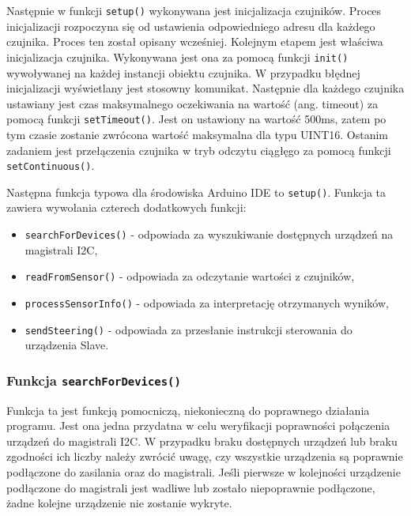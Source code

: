 \documentclass{report}
\begin{document}
Następnie w funkcji \texttt{setup()} wykonywana jest inicjalizacja czujników. Proces inicjalizacji rozpoczyna się od ustawienia odpowiedniego adresu dla każdego czujnika. Proces ten został opisany wcześniej. Kolejnym etapem jest właściwa inicjalizacja czujnika. Wykonywana jest ona za pomocą funkcji \texttt{init()} wywoływanej na każdej instancji obiektu czujnika. W przypadku błędnej inicjalizacji wyświetlany jest stosowny komunikat. Następnie dla każdego czujnika ustawiany jest czas maksymalnego oczekiwania na wartość (ang. timeout) za pomocą funkcji \texttt{setTimeout()}. Jest on ustawiony na wartość 500ms, zatem po tym czasie zostanie zwrócona wartość maksymalna dla typu UINT16. Ostanim zadaniem jest przełączenia czujnika w tryb odczytu ciągłęgo za pomocą funkcji \texttt{setContinuous()}.


Następna funkcja typowa dla środowiska Arduino IDE to \texttt{setup()}. Funkcja ta zawiera wywołania czterech dodatkowych funkcji:
\begin{itemize}
    \item \texttt{searchForDevices()} - odpowiada za wyszukiwanie dostępnych urządzeń na magistrali I2C,
    \item \texttt{readFromSensor()} - odpowiada za odczytanie wartości z czujników,
    \item \texttt{processSensorInfo()} - odpowiada za interpretację otrzymanych wyników,
    \item \texttt{sendSteering()} - odpowiada za przesłanie instrukcji sterowania do urządzenia Slave.
\end{itemize}

\subsubsection*{Funkcja \texttt{searchForDevices()}}

Funkcja ta jest funkcją pomocniczą, niekonieczną do poprawnego działania programu. Jest ona jedna przydatna w celu weryfikacji poprawności połączenia urządzeń do magistrali I2C. W przypadku braku dostępnych urządzeń lub braku zgodności ich liczby należy zwrócić uwagę, czy wszystkie urządzenia są poprawnie podłączone do zasilania oraz do magistrali. Jeśli pierwsze w kolejności urządzenie podłączone do magistrali jest wadliwe lub zostało niepoprawnie podłączone, żadne kolejne urządzenie nie zostanie wykryte. 
\end{document}
